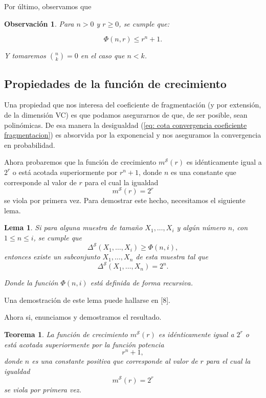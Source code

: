 \documentclass{article}
\newtheorem{thm}{Teorema}[subsection]
\newtheorem{lem}{Lema}[subsection]
\newtheorem{obs}{Observación}[subsection]
\begin{document}
Por último, observamos que

\begin{obs}   
Para \( n > 0 \) y \( r \geq 0 \), se cumple que:

\[
\Phi(n, r) \leq r^n + 1.
\]

Y tomaremos \( \binom{n}{k} = 0 \) en el caso que \( n < k \).\newline
\end{obs}

\subsection{Propiedades de la función de crecimiento}

Una propiedad que nos interesa del coeficiente de fragmentación (y por extensión, de la dimensión VC) es que podamos asegurarnos
de que, de ser posible, sean polinómicas. De esa manera la desigualdad (\ref{eq: cota convergencia coeficiente fragmentacion})
es absorvida por la exponencial y nos aseguramos la convergencia en probabilidad. \newline

Ahora probaremos que la función de crecimiento $m^{\mathcal{S}}(r)$ 
es idénticamente igual a \( 2^r \) o está acotada superiormente por \( r^n + 1 \),  
donde \( n \) es una constante que corresponde al valor de \( r \) para el cual la igualdad  
\[
m^{\mathcal{S}}(r) = 2^r
\]
se viola por primera vez. Para demostrar este hecho, necesitamos el siguiente lema.\newline

\begin{lem}
Si para alguna muestra de tamaño \( X_1, \dots, X_i \) y algún número \( n \), con \( 1 \leq n \leq i \),  
se cumple que  
\[
\Delta^{\mathcal{S}}(X_1, \dots, X_i) \geq \Phi(n, i),
\]  
entonces existe un subconjunto \( X_1, \dots, X_n \) de esta muestra tal que  
\[
\Delta^{\mathcal{S}}(X_1, \dots, X_n) = 2^n.
\]  

Donde la función \( \Phi(n, i) \) está definida de forma recursiva.  
\end{lem}

Una demostración de este lema puede hallarse en [8].\newline

Ahora si, enunciamos y demostramos el resultado.\newline

\begin{thm}
    La función de crecimiento \( m^{\mathcal{S}}(r) \) es idénticamente igual a \( 2^r \) o está acotada superiormente por la función potencia  
    \[
    r^n + 1,
    \]
    donde \( n \) es una constante positiva que corresponde al valor de \( r \) para el cual la igualdad  
    \[
    m^{\mathcal{S}}(r) = 2^r
    \]
    se viola por primera vez.    
\end{thm}
\end{document}
